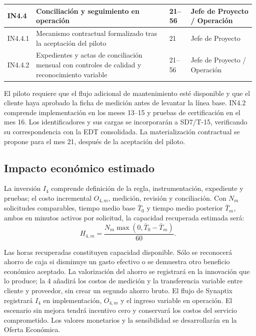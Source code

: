 \begin{longtable}{
L{\tabcolsep\relax}
L{\tabcolsep\relax}
L{\tabcolsep\relax}
L{\tabcolsep\relax}
}
\textbf{IN4.4} &
\textbf{Conciliación y seguimiento en operación} &
\textbf{21--56} &
\textbf{Jefe de Proyecto / Operación} \\
\hline
IN4.4.1 & Mecanismo contractual formalizado
tras la aceptación del piloto &
21 & Jefe de Proyecto \\
\hline
IN4.4.2 & Expedientes y actas de conciliación mensual
con controles de calidad y reconocimiento variable &
21--56 & Jefe de Proyecto / Operación \\
\hline
\end{longtable}


El piloto requiere que el flujo adicional de mantenimiento esté
disponible y que el cliente haya aprobado la ficha de medición antes
de levantar la línea base. IN4.2 comprende implementación en los meses
13--15 y pruebas de certificación en el mes 16. Los identificadores y
sus cargas se incorporarán a SD7/T-15, verificando su correspondencia
con la EDT consolidada. La materialización contractual se propone
para el mes 21, después de la aceptación del piloto.

\subsection{Impacto económico estimado}

La inversión \(I_4\) comprende definición de la regla, instrumentación, expediente y pruebas; el costo incremental \(O_{4,m}\), medición, revisión y conciliación. Con \(N_m\) solicitudes comparables, tiempo medio base \(\bar T_0\) y tiempo medio posterior \(\bar T_m\), ambos en minutos activos por solicitud, la capacidad recuperada estimada será:
\[
  H_{4,m}=\frac{N_m\max(0,\bar T_0-\bar T_m)}{60}.
\]

Las horas recuperadas constituyen capacidad disponible. Sólo se reconocerá ahorro de caja si disminuye un gasto efectivo o se demuestra otro beneficio económico aceptado. La valorización del ahorro se registrará en la innovación que lo produce; la 4 añadirá los costos de medición y la transferencia variable entre cliente y proveedor, sin crear un segundo ahorro bruto. El flujo de Synaptix registrará \(I_4\) en implementación, \(O_{4,m}\) y el ingreso variable en operación. El escenario sin mejora tendrá incentivo cero y conservará los costos del servicio comprometido. Los valores monetarios y la sensibilidad se desarrollarán en la Oferta Económica.

